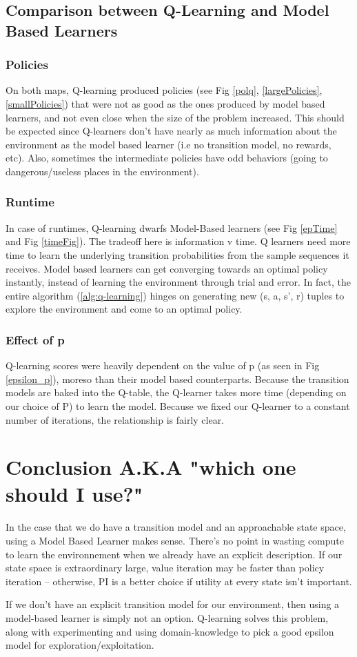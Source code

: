 \documentclass[letter]{article}
\begin{document}
\subsection{Comparison between Q-Learning and Model Based Learners}
\subsubsection{Policies}
On both maps, Q-learning produced policies (see Fig \ref{polq}, \ref{largePolicies}, \ref{smallPolicies}) that were not as good as the ones produced by model based learners, and not even close when the size of the problem increased. This should be expected since Q-learners don't have nearly as much information about the environment as the model based learner (i.e no transition model, no rewards, etc). Also, sometimes the intermediate policies have odd behaviors (going to dangerous/useless places in the environment).
\subsubsection{Runtime}
In case of runtimes, Q-learning dwarfs Model-Based learners (see Fig \ref{epTime} and Fig \ref{timeFig}). The tradeoff here is information v time. Q learners need more time to learn the underlying transition probabilities from the sample sequences it receives. Model based learners can get converging towards an optimal policy instantly, instead of learning the environment through trial and error. In fact, the entire algorithm (\ref{alg:q-learning}) hinges on generating new (s, a, s', r) tuples to explore the environment and come to an optimal policy.
\subsubsection{Effect of p}
Q-learning scores were heavily dependent on the value of p (as seen in Fig \ref{epsilon_p}), moreso than their model based counterparts. Because the transition models are baked into the Q-table, the Q-learner takes more time (depending on our choice of P) to learn the model. Because we fixed our Q-learner to a constant number of iterations, the relationship is fairly clear.

\section{Conclusion A.K.A "which one should I use?"}
In the case that we do have a transition model and an approachable state space, using a Model Based Learner makes sense. There's no point in wasting compute to learn the environnement when we already have an explicit description. If our state space is extraordinary large, value iteration may be faster than policy iteration -- otherwise, PI is a better choice if utility at every state isn't important.

If we don't have an explicit transition model for our environment, then using a model-based learner is simply not an option. Q-learning solves this problem, along with experimenting and using domain-knowledge to pick a good epsilon model for exploration/exploitation.

\printbibliography
\end{document}
